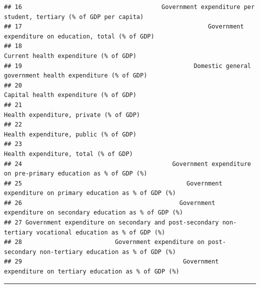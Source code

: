 \documentclass[
]{article}
\newenvironment{Shaded}{\begin{snugshade}}{\end{snugshade}}
\newcommand{\FunctionTok}[1]{\textcolor[rgb]{0.00,0.00,0.00}{#1}}
\newcommand{\NormalTok}[1]{#1}
\newcommand{\SpecialCharTok}[1]{\textcolor[rgb]{0.00,0.00,0.00}{#1}}
\newcommand{\StringTok}[1]{\textcolor[rgb]{0.31,0.60,0.02}{#1}}
\begin{document}
\begin{verbatim}
## 16                                       Government expenditure per student, tertiary (% of GDP per capita)
## 17                                                    Government expenditure on education, total (% of GDP)
## 18                                                                    Current health expenditure (% of GDP)
## 19                                                Domestic general government health expenditure (% of GDP)
## 20                                                                    Capital health expenditure (% of GDP)
## 21                                                                   Health expenditure, private (% of GDP)
## 22                                                                    Health expenditure, public (% of GDP)
## 23                                                                     Health expenditure, total (% of GDP)
## 24                                          Government expenditure on pre-primary education as % of GDP (%)
## 25                                              Government expenditure on primary education as % of GDP (%)
## 26                                            Government expenditure on secondary education as % of GDP (%)
## 27 Government expenditure on secondary and post-secondary non-tertiary vocational education as % of GDP (%)
## 28                          Government expenditure on post-secondary non-tertiary education as % of GDP (%)
## 29                                             Government expenditure on tertiary education as % of GDP (%)
\end{verbatim}

\begin{center}\rule{0.5\linewidth}{0.5pt}\end{center}

\begin{Shaded}
\end{Shaded}
\end{document}
